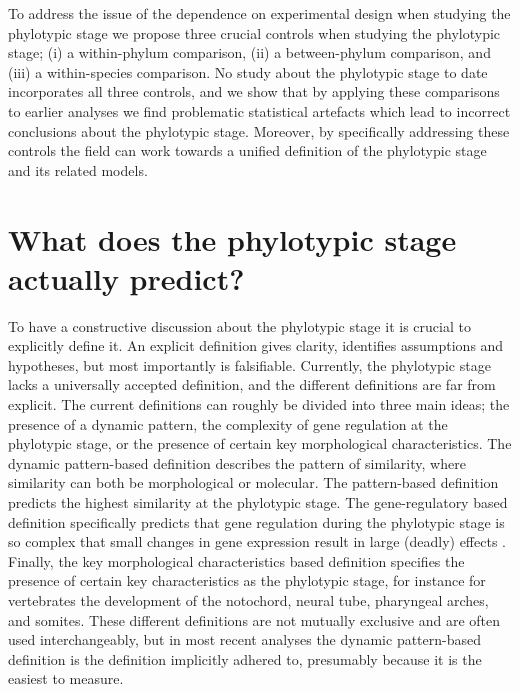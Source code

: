 To address the issue of the dependence on experimental design when studying the phylotypic stage we propose three crucial controls when studying the phylotypic stage; (i) a within-phylum comparison, (ii) a between-phylum comparison, and (iii) a within-species comparison. No study about the phylotypic stage to date incorporates all three controls, and we show that by applying these comparisons to earlier analyses we find problematic statistical artefacts which lead to incorrect conclusions about the phylotypic stage. Moreover, by specifically addressing these controls the field can work towards a unified definition of the phylotypic stage and its related models.

\section{What does the phylotypic stage actually predict?}

To have a constructive discussion about the phylotypic stage it is crucial to explicitly define it. An explicit definition gives clarity, identifies assumptions and hypotheses, but most importantly is falsifiable. Currently, the phylotypic stage lacks a universally accepted definition, and the different definitions are far from explicit. The current definitions can roughly be divided into three main ideas; the presence of a dynamic pattern, the complexity of gene regulation at the phylotypic stage, or the presence of certain key morphological characteristics\cite{OlafRP2003}. The dynamic pattern-based definition describes the pattern of similarity, where similarity can both be morphological or molecular\cite{Slack1993,Duboule1994}. The pattern-based definition predicts the highest similarity at the phylotypic stage. The gene-regulatory based definition specifically predicts that gene regulation during the phylotypic stage is so complex that small changes in gene expression result in large (deadly) effects \cite{raff1996}. Finally, the key morphological characteristics based definition specifies the presence of certain key characteristics as the phylotypic stage, for instance for vertebrates the development of the notochord, neural tube, pharyngeal arches, and somites\cite{Kimmel1995}. These different definitions are not mutually exclusive and are often used interchangeably, but in most recent analyses the dynamic pattern-based definition is the definition implicitly adhered to, presumably because it is the easiest to measure.


